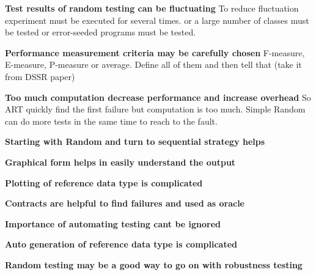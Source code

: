 \textbf{Test results of random testing can be fluctuating}
To reduce fluctuation experiment must be executed for several times.
or a large number of classes must be tested
or error-seeded programs must be tested.

 
\textbf{Performance measurement criteria may be carefully chosen}
F-measure, E-measure, P-measure or average.
Define all of them and then tell that (take it from DSSR paper)

   
\textbf{Too much computation decrease performance and increase overhead}
So ART quickly find the first failure but computation is too much.
Simple Random can do more tests in the same time to reach to the fault.

\textbf{Starting with Random and turn to sequential strategy helps}

\textbf{Graphical form helps in easily understand the output}

\textbf{Plotting of reference data type is complicated}

\textbf{Contracts are helpful to find failures and used as oracle}

\textbf{Importance of automating testing cant be ignored}

\textbf{Auto generation of reference data type is complicated}

\textbf{Random testing may be a good way to go on with robustness testing}





